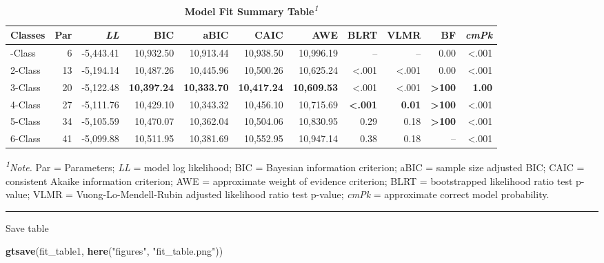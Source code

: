 \documentclass[
]{book}
\newenvironment{Shaded}{\begin{snugshade}}{\end{snugshade}}
\newcommand{\FunctionTok}[1]{\textcolor[rgb]{0.13,0.29,0.53}{\textbf{#1}}}
\newcommand{\NormalTok}[1]{#1}
\newcommand{\StringTok}[1]{\textcolor[rgb]{0.31,0.60,0.02}{#1}}
\begin{document}
\begin{table}[!t]
\caption*{
{\large \textbf{Model Fit Summary Table}\textsuperscript{\textit{1}}}
} 
\fontsize{12.0pt}{14.4pt}\selectfont
\begin{tabular*}{\linewidth}{@{\extracolsep{\fill}}lrrrrrrrrrr}
\toprule
Classes & Par & \emph{LL} & BIC & aBIC & CAIC & AWE & BLRT & VLMR & BF & \emph{cmPk} \\ 
\midrule\addlinespace[2.5pt]
1-Class & 6 & -5,443.41 & 10,932.50 & 10,913.44 & 10,938.50 & 10,996.19 & – & – & 0.00 & <.001 \\ 
2-Class & 13 & -5,194.14 & 10,487.26 & 10,445.96 & 10,500.26 & 10,625.24 & <.001 & <.001 & 0.00 & <.001 \\ 
3-Class & 20 & -5,122.48 & {\bfseries 10,397.24} & {\bfseries 10,333.70} & {\bfseries 10,417.24} & {\bfseries 10,609.53} & <.001 & <.001 & {\bfseries >100} & {\bfseries 1.00} \\ 
4-Class & 27 & -5,111.76 & 10,429.10 & 10,343.32 & 10,456.10 & 10,715.69 & {\bfseries <.001} & {\bfseries 0.01} & {\bfseries >100} & <.001 \\ 
5-Class & 34 & -5,105.59 & 10,470.07 & 10,362.04 & 10,504.06 & 10,830.95 & 0.29 & 0.18 & {\bfseries >100} & <.001 \\ 
6-Class & 41 & -5,099.88 & 10,511.95 & 10,381.69 & 10,552.95 & 10,947.14 & 0.38 & 0.18 & – & <.001 \\ 
\bottomrule
\end{tabular*}
\begin{minipage}{\linewidth}
\textsuperscript{\textit{1}}\emph{Note.} Par = Parameters; \emph{LL} = model log likelihood;
BIC = Bayesian information criterion;
aBIC = sample size adjusted BIC; CAIC = consistent Akaike information criterion;
AWE = approximate weight of evidence criterion;
BLRT = bootstrapped likelihood ratio test p-value;
VLMR = Vuong-Lo-Mendell-Rubin adjusted likelihood ratio test p-value;
\emph{cmPk} = approximate correct model probability.\\
\end{minipage}
\end{table}

\begin{center}\rule{0.5\linewidth}{0.5pt}\end{center}

Save table

\begin{Shaded}
\begin{Highlighting}[]
\FunctionTok{gtsave}\NormalTok{(fit\_table1, }\FunctionTok{here}\NormalTok{(}\StringTok{"figures"}\NormalTok{, }\StringTok{"fit\_table.png"}\NormalTok{))}
\end{Highlighting}
\end{Shaded}
\end{document}

